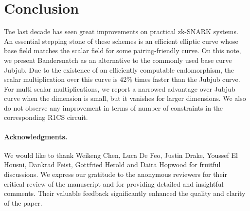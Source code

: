 \documentclass[version=preprint]{iacrcc}
\begin{document}
\section{Conclusion}
Tne last decade has seen great improvements on practical zk-SNARK systems.
An essential stepping stone of these schemes is an efficient elliptic
curve whose base field matches the scalar field for some pairing-friendly curve.
On this note, we present Bandersnatch as an alternative to the commonly used
base curve Jubjub. Due to the existence of an efficiently computable
endomorphism, the scalar multiplication over this curve is 42\% times
faster than the Jubjub curve.
For multi scalar multiplications, we report a narrowed advantage over Jubjub 
curve when the dimension is small, but it vanishes for larger
dimensions.
We also do not observe any improvement in terms of number of constraints in 
the corresponding R1CS circuit.

 \paragraph*{\textbf{Acknowledgments.}} We would like to thank Weikeng
 Chen, Luca De Feo, Justin Drake, Youssef El Housni, Dankrad Feist,
 Gottfried Herold and Daira Hopwood for fruitful discussions. 
 We express our gratitude to the anonymous reviewers for their critical review of the manuscript and for providing detailed and insightful comments. 
 Their valuable feedback significantly enhanced the quality and clarity of the paper.


\end{document}

